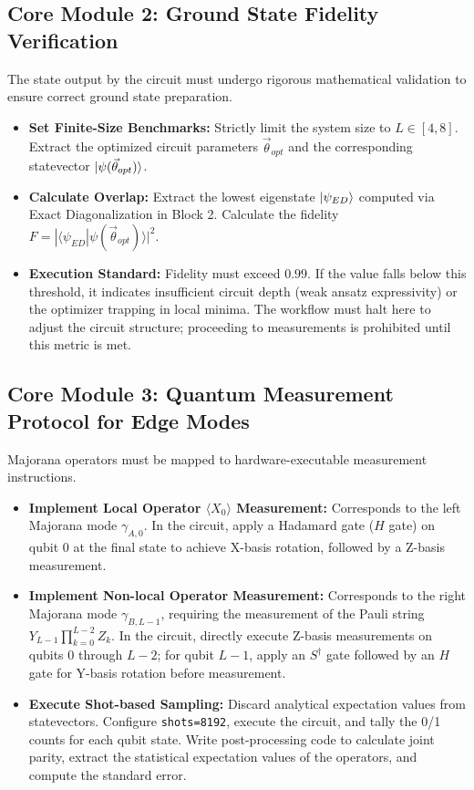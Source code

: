 \documentclass[12pt, a4paper]{article}
\begin{document}
\subsection{Core Module 2: Ground State Fidelity Verification}
The state output by the circuit must undergo rigorous mathematical validation to ensure correct ground state preparation.
\begin{itemize}
    \item \textbf{Set Finite-Size Benchmarks:} Strictly limit the system size to $L \in [4, 8]$. Extract the optimized circuit parameters $\vec{\theta}_{opt}$ and the corresponding statevector $\ket{\psi(\vec{\theta}_{opt})}$.
    \item \textbf{Calculate Overlap:} Extract the lowest eigenstate $\ket{\psi_{ED}}$ computed via Exact Diagonalization in Block 2. Calculate the fidelity $F = |\langle \psi_{ED} | \psi(\vec{\theta}_{opt}) \rangle|^2$.
    \item \textbf{Execution Standard:} Fidelity must exceed $0.99$. If the value falls below this threshold, it indicates insufficient circuit depth (weak ansatz expressivity) or the optimizer trapping in local minima. The workflow must halt here to adjust the circuit structure; proceeding to measurements is prohibited until this metric is met.
\end{itemize}

\subsection{Core Module 3: Quantum Measurement Protocol for Edge Modes}
Majorana operators must be mapped to hardware-executable measurement instructions.
\begin{itemize}
    \item \textbf{Implement Local Operator $\langle X_0 \rangle$ Measurement:} Corresponds to the left Majorana mode $\gamma_{A,0}$. In the circuit, apply a Hadamard gate ($H$ gate) on qubit 0 at the final state to achieve X-basis rotation, followed by a Z-basis measurement.
    \item \textbf{Implement Non-local Operator Measurement:} Corresponds to the right Majorana mode $\gamma_{B,L-1}$, requiring the measurement of the Pauli string $Y_{L-1} \prod_{k=0}^{L-2} Z_k$. In the circuit, directly execute Z-basis measurements on qubits 0 through $L-2$; for qubit $L-1$, apply an $S^\dagger$ gate followed by an $H$ gate for Y-basis rotation before measurement.
    \item \textbf{Execute Shot-based Sampling:} Discard analytical expectation values from statevectors. Configure \texttt{shots=8192}, execute the circuit, and tally the 0/1 counts for each qubit state. Write post-processing code to calculate joint parity, extract the statistical expectation values of the operators, and compute the standard error.
\end{itemize}
\end{document}
